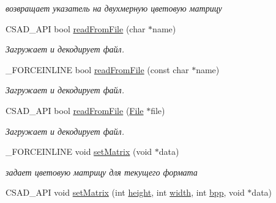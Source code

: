 \begin{DoxyCompactItemize}
\begin{DoxyCompactList}\small\item\em возвращает указатель на двухмерную цветовую матрицу \end{DoxyCompactList}\item 
\hypertarget{classcsad_1_1_format_j_p_g_a1a6d6fdeed54dfe07d3d230bced2c1f6}{C\-S\-A\-D\-\_\-\-A\-P\-I bool \hyperlink{classcsad_1_1_format_j_p_g_a1a6d6fdeed54dfe07d3d230bced2c1f6}{read\-From\-File} (char $\ast$name)}\label{classcsad_1_1_format_j_p_g_a1a6d6fdeed54dfe07d3d230bced2c1f6}

\begin{DoxyCompactList}\small\item\em Загружает и декодирует файл. \end{DoxyCompactList}\item 
\hypertarget{classcsad_1_1_format_j_p_g_a3f24728b4fbae6a6fbc9ed0631c318fe}{\-\_\-\-F\-O\-R\-C\-E\-I\-N\-L\-I\-N\-E bool \hyperlink{classcsad_1_1_format_j_p_g_a3f24728b4fbae6a6fbc9ed0631c318fe}{read\-From\-File} (const char $\ast$name)}\label{classcsad_1_1_format_j_p_g_a3f24728b4fbae6a6fbc9ed0631c318fe}

\begin{DoxyCompactList}\small\item\em Загружает и декодирует файл. \end{DoxyCompactList}\item 
\hypertarget{classcsad_1_1_format_j_p_g_a85348c86c213591aca70fcabf263b28a}{C\-S\-A\-D\-\_\-\-A\-P\-I bool \hyperlink{classcsad_1_1_format_j_p_g_a85348c86c213591aca70fcabf263b28a}{read\-From\-File} (\hyperlink{classcsad_1_1_file}{File} $\ast$file)}\label{classcsad_1_1_format_j_p_g_a85348c86c213591aca70fcabf263b28a}

\begin{DoxyCompactList}\small\item\em Загружает и декодирует файл. \end{DoxyCompactList}\item 
\hypertarget{classcsad_1_1_format_j_p_g_aaff0ede2ca4dcd16b0f97ca92700cfa9}{\-\_\-\-F\-O\-R\-C\-E\-I\-N\-L\-I\-N\-E void \hyperlink{classcsad_1_1_format_j_p_g_aaff0ede2ca4dcd16b0f97ca92700cfa9}{set\-Matrix} (void $\ast$data)}\label{classcsad_1_1_format_j_p_g_aaff0ede2ca4dcd16b0f97ca92700cfa9}

\begin{DoxyCompactList}\small\item\em задает цветовую матрицу для текущего формата \end{DoxyCompactList}\item 
\hypertarget{classcsad_1_1_format_j_p_g_ae18001750b21ddaff6d05a52a146ff08}{C\-S\-A\-D\-\_\-\-A\-P\-I void \hyperlink{classcsad_1_1_format_j_p_g_ae18001750b21ddaff6d05a52a146ff08}{set\-Matrix} (int \hyperlink{classcsad_1_1_format_j_p_g_a126275f7c14f4a00733b19aace6338d0}{height}, int \hyperlink{classcsad_1_1_format_j_p_g_a1a3684e2216ec08fee5d016bf3a12338}{width}, int \hyperlink{classcsad_1_1_format_j_p_g_ad79274615ffe7197681de1f7d74ab679}{bpp}, void $\ast$data)}\label{classcsad_1_1_format_j_p_g_ae18001750b21ddaff6d05a52a146ff08}


\end{DoxyCompactItemize}
